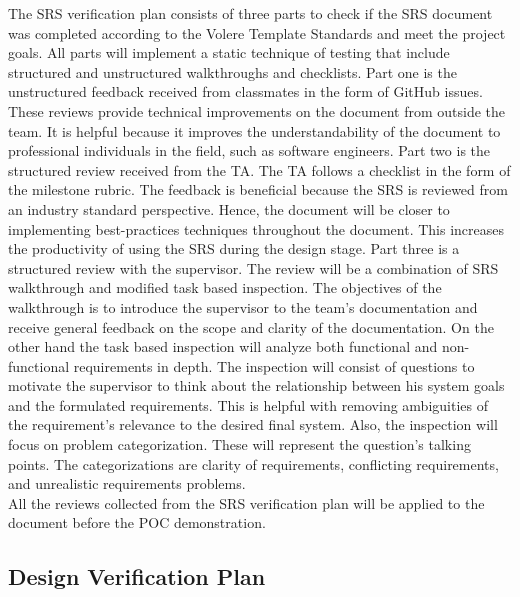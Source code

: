 \documentclass[12pt, titlepage]{article}
\begin{document}
The SRS verification plan consists of three parts to check if the SRS
document was completed according to the Volere Template Standards and 
meet the project goals. All parts will implement a static technique of 
testing that include structured and unstructured walkthroughs and
checklists. Part one is the unstructured feedback received from 
classmates in the form of GitHub issues. These reviews provide technical
improvements on the document from outside the team. It is helpful because it improves the
understandability of the document to professional individuals in the
field, such as software engineers. Part two is the structured review
received from the TA. The TA follows a checklist in the form of the
milestone rubric. The feedback is beneficial because the SRS is reviewed
from an industry standard perspective. Hence, the document will be
closer to implementing best-practices techniques throughout the
document. This increases the productivity of using the SRS during the
design stage. Part three is a structured review with the supervisor. The
review will be a combination of SRS walkthrough and modified task based inspection. 
The objectives of the walkthrough is to introduce the supervisor to the 
team's documentation and receive general feedback on the scope and 
clarity of the documentation. On the other hand the task based 
inspection will analyze both functional and non-functional
requirements in depth. The inspection will consist of questions to 
motivate the supervisor to think about the relationship between his 
system goals and the formulated requirements. This is helpful with 
removing ambiguities of the requirement's relevance to the desired final system. Also,
the inspection will focus on problem categorization.
These will represent the question's talking points.
The categorizations are clarity of requirements, conflicting requirements, and unrealistic requirements problems. \\
All the reviews collected from the SRS verification plan will be applied
to the document before the POC demonstration.


\subsection{Design Verification Plan}
\end{document}

